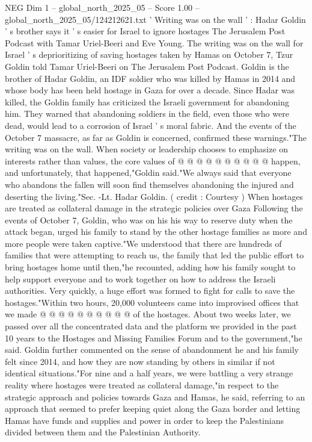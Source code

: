 \begin{textsample}{NEG Dim 1 – global\_north\_2025\_05 – Score 1.00 – global\_north\_2025\_05/124212621.txt}  \label{ex:f1_neg_233}
' Writing was on the wall ' : Hadar Goldin ' s brother says it ' s easier for Israel to ignore hostages The Jerusalem Post Podcast with Tamar Uriel-Beeri and Eve Young.
The writing was on the wall for Israel ' s deprioritizing of saving hostages taken by Hamas on October 7, Tzur Goldin told Tamar Uriel-Beeri on The Jerusalem Post Podcast.
Goldin is the brother of Hadar Goldin, an IDF soldier who was killed by Hamas in 2014 and whose body has been held hostage in Gaza for over a decade.
Since Hadar was killed, the Goldin family has criticized the Israeli government for abandoning him.
They warned that abandoning soldiers in the field, even those who were dead, would lead to a corrosion of Israel ' s moral fabric.
And the events of the October 7 massacre, as far as Goldin is concerned, confirmed these warnings."The writing was on the wall.
When society or leadership chooses to emphasize on interests rather than values, the core values of @ @ @ @ @ @ @ @ @ @ happen, and unfortunately, that happened,"Goldin said."We always said that everyone who abandons the fallen will soon find themselves abandoning the injured and deserting the living."Sec. -Lt.
Hadar Goldin. ( credit : Courtesy ) When hostages are treated as collateral damage in the strategic policies over Gaza Following the events of October 7, Goldin, who was on his his way to reserve duty when the attack began, urged his family to stand by the other hostage families as more and more people were taken captive."We understood that there are hundreds of families that were attempting to reach us, the family that led the public effort to bring hostages home until then,"he recounted, adding how his family sought to help support everyone and to work together on how to address the Israeli authorities.
Very quickly, a huge effort was formed to fight for calls to save the hostages."Within two hours, 20,000 volunteers came into improvised offices that we made @ @ @ @ @ @ @ @ @ @ of the hostages.
About two weeks later, we passed over all the concentrated data and the platform we provided in the past 10 years to the Hostages and Missing Families Forum and to the government,"he said.
Goldin further commented on the sense of abandonment he and his family felt since 2014, and how they are now standing by others in similar if not identical situations."For nine and a half years, we were battling a very strange reality where hostages were treated as collateral damage,"in respect to the strategic approach and policies towards Gaza and Hamas, he said, referring to an approach that seemed to prefer keeping quiet along the Gaza border and letting Hamas have funds and supplies and power in order to keep the Palestinians divided between them and the Palestinian Authority.

\end{textsample}
